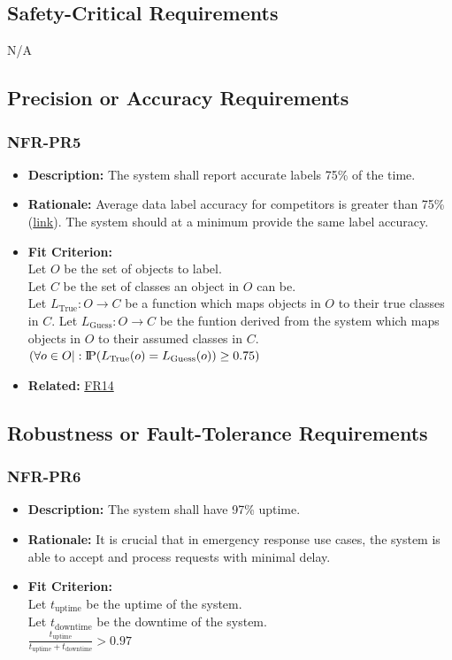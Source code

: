 \documentclass[12pt]{article}
\newcommand{\probP}{\text{I\kern-0.15em P}}
\begin{document}
\subsection{Safety-Critical Requirements}
N/A
\subsection{Precision or Accuracy Requirements}
\subsubsection*{NFR-PR5}
\label{sec:PR5}
\begin{itemize}
  \item \textbf{Description:} The system shall report accurate labels 75\% of the time.
  \item \textbf{Rationale:} Average data label accuracy for competitors is greater than 75\% (\href{https://www.researchgate.net/publication/234774537_Data_quality_from_crowdsourcing_A_study_of_annotation_selection_criteria#:~:text=Depending%20on%20the%20number%20of,%5B13%5D%20%5B14%5D%20.}{link}). The system should at a minimum provide the same label accuracy.
  \item \textbf{Fit Criterion:}\\ Let $O$ be the set of objects to label.\\
  Let $C$ be the set of classes an object in $O$ can be.\\
  Let $L_{\text{True}}: O \rightarrow C $ be a function which maps objects in $O$ to their true classes in $C$.
  Let $L_{\text{Guess}}: O \rightarrow C $ be the funtion derived from the system which maps objects in $O$ to their assumed classes in $C$.
  $(\forall o \in O|: \probP(L_{\text{True}}(o) = L_{\text{Guess}}(o))\geq 0.75)$
  \item \textbf{Related:} \hyperref[sec:FR14]{FR14}
\end{itemize}
\subsection{Robustness or Fault-Tolerance Requirements}
\subsubsection*{NFR-PR6}
\label{sec:PR6}
\begin{itemize}
  \item \textbf{Description:} The system shall have 97\% uptime. 
  \item \textbf{Rationale:} It is crucial that in emergency response use cases, the system is able to accept and process requests with minimal delay.
  \item \textbf{Fit Criterion:}\\ Let $t_{\text{uptime}}$ be the uptime of the system.\\
  Let $t_{\text{downtime}}$ be the downtime of the system.\\
  $\frac{t_{\text{uptime}}}{t_{\text{uptime}} + t_{\text{downtime}}} > 0.97$
\end{itemize}
\end{document}
